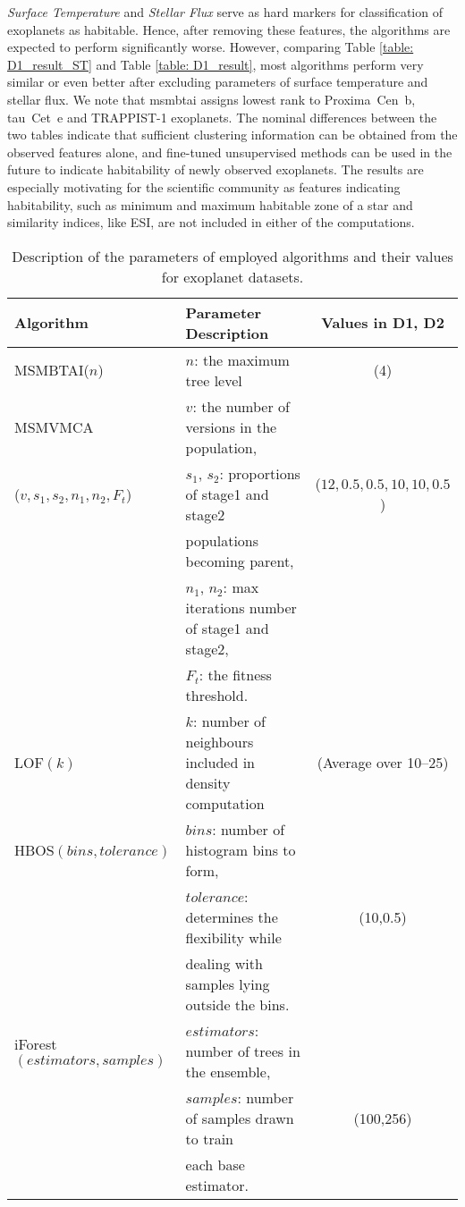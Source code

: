 \documentclass[fleqn,usenatbib]{mnras}
\begin{document}
\noindent 
\textsl{Surface Temperature} and \textsl{Stellar Flux} serve as hard markers for classification of exoplanets as habitable. Hence, after removing these features, the algorithms are expected to perform significantly worse. However, comparing Table \ref{table: D1_result_ST} and Table \ref{table: D1_result}, most algorithms perform very similar or even better after excluding parameters of surface temperature and stellar flux. We note that \acrshort{msmbtai} assigns lowest rank to Proxima~Cen~b, tau~Cet~e and TRAPPIST-1 exoplanets. The nominal differences between the two tables indicate that sufficient clustering information can be obtained from the observed features alone, and fine-tuned unsupervised methods can be used in the future to indicate habitability of newly observed exoplanets. The results are especially motivating for the scientific community as features indicating habitability, such as minimum and maximum habitable zone of a star and similarity indices, like ESI, are not included in either of the computations.

\begin{table*}
\centering
\caption{Description of the parameters of employed algorithms and their values for exoplanet datasets.}
\label{table:all_params_desc}
\begin{tabular}{|l|l|c|}
\hline
\textbf{Algorithm} & \textbf{Parameter Description} & Values in \textbf{D1, D2}\\
\hline
MSMBTAI($n$)& $n$: the maximum tree level & (4) \\
\hline
MSMVMCA   &$v$: the number of versions in the population, &  \\
($v,s_1,s_2,n_1,n_2,F_t$) & $s_1$, $s_2$: proportions of stage1 and stage2 & ($12,0.5,0.5,10,10,0.5$) \\
& populations becoming parent,  & \\
& $n_1$, $n_2$: max iterations number of stage1 and stage2, &   \\
& $F_t$: the fitness threshold.  &  \\
 \hline
LOF$(k)$ & $k$: number of neighbours included in density computation &  (Average over 10--25)\\
 \hline
HBOS$(bins,tolerance)$ & $bins$: number of histogram bins to form, & \\
& $tolerance$: determines the flexibility while &  (10,0.5)   \\
& dealing with samples lying outside the bins.  &  \\
 \hline
iForest$(estimators,samples)$ & $estimators$: number of trees in the ensemble, &  \\ 
& $samples$: number of samples drawn to train & (100,256)  \\
& each base estimator. &  \\
\hline
\end{tabular}
\end{table*} 
\end{document}
